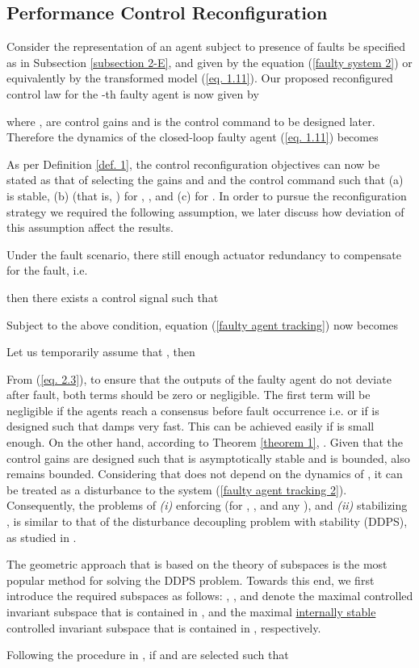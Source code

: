 \documentclass[12pt,draftcls,onecolumn]{IEEEtran}
\begin{document}
\subsection{ Performance Control Reconfiguration}\label{subsection 1}
Consider the representation of an agent subject to presence of faults be  specified as in Subsection \ref{subsection 2-E}, and given by the equation (\ref{faulty system 2}) or equivalently by the transformed model (\ref{eq. 1.11}). Our proposed reconfigured control law for the -th faulty agent is now given by

{where  ,  are control gains and  is the control command to be designed later}. Therefore the dynamics of the closed-loop faulty agent (\ref{eq. 1.11})  becomes 
\par
 As per Definition \ref{def. 1}, the  control reconfiguration objectives can now be stated as that of selecting the gains  and  and the control command  such that (a)  is stable, (b)  (that is, ) for , , and  (c)   for .  In order to pursue the reconfiguration strategy we required the following assumption, we later discuss how deviation of this assumption affect the results.
{ \begin{assumptions}\label{stuck condition1}
 Under the fault scenario, there still enough actuator redundancy to compensate for the fault, i.e.

\end{assumptions}
 then there exists a control signal   such that }
  
 Subject to the above condition, equation (\ref{faulty agent tracking}) now becomes
\par
 Let us  temporarily assume that  , then
 
{ From (\ref{eq. 2.3}), to ensure that the outputs of the faulty agent do not deviate after fault, both terms should be zero or negligible. The first term will be negligible if the agents reach a consensus before fault occurrence i.e.  or if   is designed such that   damps very fast.  This can be  achieved easily if  is small enough. }
On the other hand,   according to Theorem \ref{theorem 1}, . Given that the control gains are designed such that  is asymptotically stable and  is bounded,   also remains bounded.  Considering that  does not depend on the dynamics of , it can be treated as a disturbance to the system (\ref{faulty agent tracking 2}).  
Consequently, the problems of \emph{(i)} enforcing  (for , ,  and any ), and \emph{(ii)} stabilizing  ,  is similar to that of the disturbance decoupling problem with stability (DDPS), as studied in \cite{Lunze2006}. \par
 The geometric approach that is based on the  theory of subspaces \cite{Basile92} is the most popular method for solving the DDPS problem. Towards this end, we first  introduce the required subspaces as follows:
 , ,  and  denote the maximal  controlled invariant  subspace that is contained in , and the maximal \underline{ internally stable}  controlled invariant  subspace that is contained in , respectively. \par
 Following the procedure in \cite{Basile92}, if  and  are selected such that 
 
\end{document}
